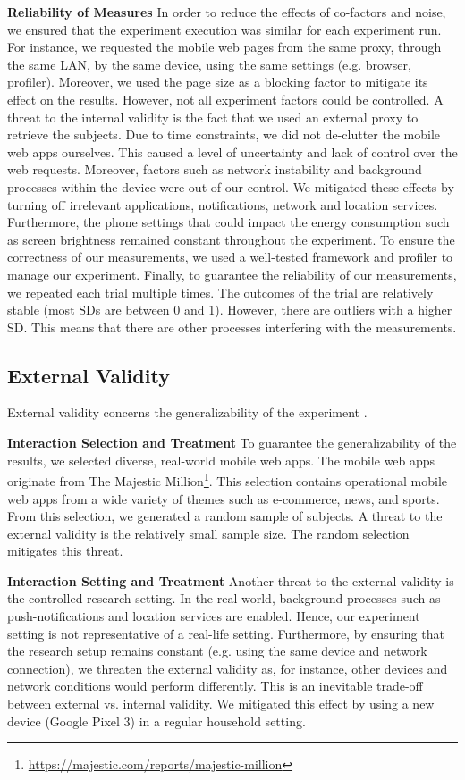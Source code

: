 \noindent  \textbf{Reliability of Measures}
In order to reduce the effects of co-factors and noise, we ensured that the experiment execution was similar for each experiment run. For instance, we requested the mobile web pages from the same proxy, through the same LAN, by the same device, using the same settings (e.g. browser, profiler). Moreover, we used the page size as a blocking factor to mitigate its effect on the results. However, not all experiment factors could be controlled. A threat to the internal validity is the fact that we used an external proxy to retrieve the subjects. Due to time constraints, we did not de-clutter the mobile web apps ourselves. This caused a level of uncertainty and lack of control over the web requests. Moreover, factors such as network instability and background processes within the device were out of our control. We mitigated these effects by turning off irrelevant applications, notifications, network and location services. Furthermore, the phone settings that could impact the energy consumption such as screen brightness remained constant throughout the experiment. To ensure the correctness of our measurements, we used a well-tested framework and profiler to manage our experiment. Finally, to guarantee the reliability of our measurements, we repeated each trial multiple times. The outcomes of the trial are relatively stable (most SDs are between 0 and 1). However, there are outliers with a higher SD. This means that there are other processes interfering with the measurements.

\subsection{External Validity}

External validity concerns the generalizability of the experiment \cite{wohlin2012experimentation}.

\noindent \textbf{Interaction Selection and Treatment}
To guarantee the generalizability of the results, we selected diverse, real-world mobile web apps. The mobile web apps originate from The Majestic Million\footnote{\url{https://majestic.com/reports/majestic-million}}. This selection contains operational mobile web apps from a wide variety of themes such as e-commerce, news, and sports. From this selection, we generated a random sample of subjects. A threat to the external validity is the relatively small sample size. The random selection mitigates this threat. 

\noindent \textbf{Interaction Setting and Treatment}
Another threat to the external validity is the controlled research setting. In the real-world, background processes such as push-notifications and location services are enabled. Hence, our experiment setting is not representative of a real-life setting. Furthermore, by ensuring that the research setup remains constant (e.g. using the same device and network connection), we threaten the external validity as, for instance, other devices and network conditions would perform differently. This is an inevitable trade-off between external vs. internal validity. We mitigated this effect by using a new device (Google Pixel 3) in a regular household setting.

